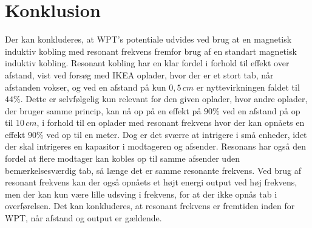 \section{Konklusion}
Der kan konkluderes, at WPT's potentiale udvides ved brug at en magnetisk induktiv kobling med resonant frekvens fremfor brug af en standart magnetisk induktiv kobling. Resonant kobling har en klar fordel i forhold til effekt over afstand, vist ved forsøg med IKEA oplader, hvor der er et stort tab, når afstanden vokser, og ved en afstand på kun $0,5 \, cm$ er nyttevirkningen faldet til $44\%$. Dette er selvfølgelig kun relevant for den given oplader, hvor andre oplader, der bruger samme princip, kan nå op på en effekt på $90\%$ ved en afstand på op til $10 \, cm$, i forhold til en oplader med resonant frekvens hvor der kan opnåets en effekt $90\%$ ved op til en meter. Dog er det sværre at intrigere i små enheder, idet der skal intrigeres en kapasitor i modtageren og afsender. Resonans har også den fordel at flere modtager kan kobles op til samme afsender uden bemærkelsesværdig tab, så længe det er samme resonante frekvens. Ved brug af resonant frekvens kan der også opnåets et højt energi output ved høj frekvens, men der kan kun være lille udsving i frekvens, for at der ikke opnås tab i overførelsen. Det kan konkluderes, at resonant frekvens er fremtiden inden for WPT, når afstand og output er gældende.
